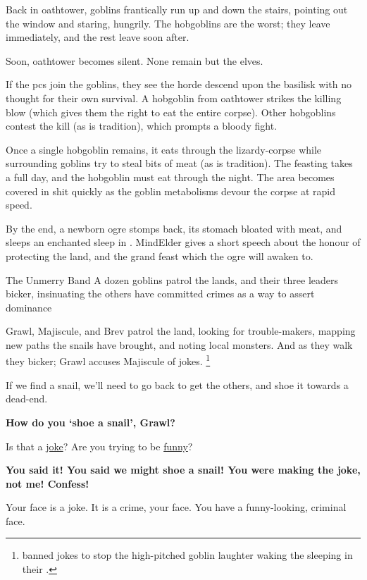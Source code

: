 Back in \gls{oathtower}, goblins frantically run up and down the stairs, pointing out the window and staring, hungrily.
The hobgoblins are the worst; they leave immediately, and the rest leave soon after.

Soon, \gls{oathtower} becomes silent.
None remain but the elves.

If the \glspl{pc} join the goblins, they see the horde descend upon the \gls{basilisk} with no thought for their own survival.
A hobgoblin from \gls{oathtower} strikes the killing blow (which gives them the right to eat the entire corpse).
Other hobgoblins contest the kill (as is tradition), which prompts a bloody fight.

Once a single hobgoblin remains, it eats through the lizardy-corpse while surrounding goblins try to steal bits of meat (as is tradition).
The feasting takes a full day, and the hobgoblin must eat through the night.
The area becomes covered in shit quickly as the goblin metabolisms devour the corpse at rapid speed.

By the end, a newborn \gls{ogre} stomps back, its stomach bloated with meat, and sleeps an enchanted sleep in .
\Gls{MindElder} gives a short speech about the honour of protecting the land, and the grand feast which the \gls{ogre} will awaken to.

{The Unmerry Band}%
{A dozen goblins patrol the lands, and their three leaders bicker, insinuating the others have committed crimes as a way to assert dominance}%

Grawl, Majiscule, and Brev patrol the land, looking for trouble-makers, mapping new paths the snails have brought, and noting local monsters.
And as they walk they bicker; Grawl accuses Majiscule of jokes.%
\footnote{ banned jokes to stop the high-pitched goblin laughter waking the  sleeping in their .}

\begin{speechtext}
  If we find a snail, we'll need to go back to get the others, and shoe it towards a dead-end.

  \textbf{How do you `shoe a snail', Grawl?}

  Is that a \underline{joke}?
  Are you trying to be \underline{funny}?

  \textbf{You said it!
  You said we might shoe a snail!
  You were making the joke, not me!
  Confess!}

  Your face is a joke.
  It is a crime, your face.
  You have a funny-looking, criminal face.
\end{speechtext}

